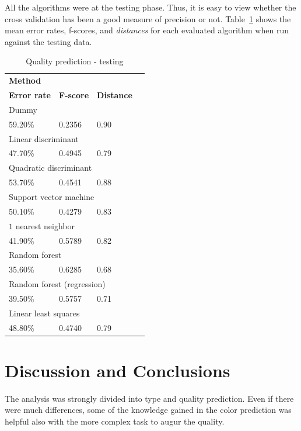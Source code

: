\documentclass[twoside]{article}
\begin{document}
\begin{multicols}{2}
All the algorithms were at the testing phase. Thus, it is easy to view whether the cross validation has been a good measure of precision or not.
Table~\ref{table:quality_testing} shows the mean error rates, f-scores, and \emph{distances} for each evaluated algorithm when run against the testing data.

\begin{table}[H]
\caption{Quality prediction - testing}
\label{table:quality_testing}
\centering
\begin{tabular}{llll}
\multicolumn{3}{l}{\textbf{Method}} \\
\textbf{Error rate} & \textbf{F-score} & \textbf{Distance} \\
\midrule
\multicolumn{3}{l}{Dummy} \\
59.20\% & 0.2356 & 0.90 \\
\multicolumn{3}{l}{Linear discriminant} \\
47.70\% & 0.4945 & 0.79 \\
\multicolumn{3}{l}{Quadratic discriminant} \\
53.70\% & 0.4541 & 0.88 \\
\multicolumn{3}{l}{Support vector machine} \\
50.10\% & 0.4279 & 0.83 \\
\multicolumn{3}{l}{$1$ nearest neighbor} \\
41.90\% & 0.5789 & 0.82 \\
\multicolumn{3}{l}{Random forest} \\
35.60\% & 0.6285 & 0.68 \\
\multicolumn{3}{l}{Random forest (regression)} \\
39.50\% & 0.5757 & 0.71 \\
\multicolumn{3}{l}{Linear least squares} \\
48.80\% & 0.4740 & 0.79 \\
\end{tabular}
\end{table}


\section{Discussion and Conclusions}

The analysis was strongly divided into type and quality prediction.
Even if there were much differences, some of the knowledge gained in the color prediction
was helpful also with the more complex task to augur the quality.


\end{multicols}
\end{document}

